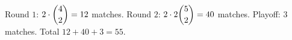 Round $1$: $2\cdot\dbinom42=12$ matches. Round $2$: $2\cdot2\dbinom52=40$ matches. Playoff: $3$ matches. Total $12+40+3=\boxed{55}$.

